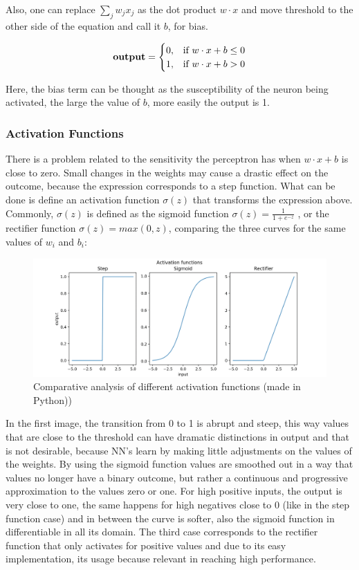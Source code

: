 Also, one can replace $ \sum_j w_j x_j$ as the dot product $w \cdot x $ and move threshold to the other side of the equation and call it $b$, for bias.

 \begin{equation}
 \mbox{\textbf{output}} = \begin{cases} 0, & \mbox{if } w \cdot x + b \le 0 \\ 1, & \mbox{if }  w \cdot x + b > 0 \end{cases}
 \end{equation}

Here, the bias term can be thought as the susceptibility of the neuron being activated, the large the value of $b$, more easily the output is 1. 

\subsubsection{Activation Functions}
There is a problem related to the sensitivity the perceptron has when $w \cdot x + b $ is close to zero. Small changes in the weights may cause a drastic effect on the outcome, because the expression corresponds to a step function. What can be done is define an activation function $\sigma(z)$ that transforms the expression above. Commonly,  $\sigma(z)$ is defined as the sigmoid function $\sigma(z) = \frac{1}{1+e^{-z}}$ , or the rectifier function $\sigma(z) = max(0,z) $, comparing the three curves for the same values of $w_i$ and $b_i$:

\begin{figure}[H]
	\centering
	\includegraphics[scale=1, width=\linewidth]{figures/activationfunc.png}
	\caption{Comparative analysis of different activation functions (made in Python))}
	\label{perceptron}
\end{figure} 

In the first image, the transition from 0 to 1 is abrupt and steep, this way values that are close to the threshold can have dramatic distinctions in output and that is not desirable, because NN's learn by making little adjustments on the values of the weights. By using the sigmoid function values are smoothed out in a way that values no longer have a binary outcome, but rather a continuous and  progressive approximation to the values zero or one. For high positive inputs, the output is very close to one, the same happens for high negatives close to 0 (like in the step function case) and in between the curve is softer, also the sigmoid function in differentiable in all its domain. The third case corresponds to the rectifier function that only activates for positive values and due to its easy implementation, its usage because relevant in reaching high performance.

